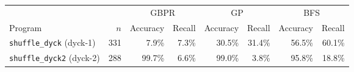 \begin{tabular}{lrrrrrrr}
\toprule
 & & \multicolumn{2}{c}{GBPR} & \multicolumn{2}{c}{GP} & \multicolumn{2}{c}{BFS} \\
\cmidrule(lr){3-4}\cmidrule(lr){5-6}\cmidrule(lr){7-8}
Program & $n$ & Accuracy & Recall & Accuracy & Recall & Accuracy & Recall \\
\midrule
\texttt{shuffle\_dyck} (dyck-1) & 331 & 7.9\% & 7.3\% & 30.5\% & 31.4\% & 56.5\% & 60.1\% \\
\texttt{shuffle\_dyck2} (dyck-2) & 288 & 99.7\% & 6.6\% & 99.0\% & 3.8\% & 95.8\% & 18.8\% \\
\bottomrule
\end{tabular}
